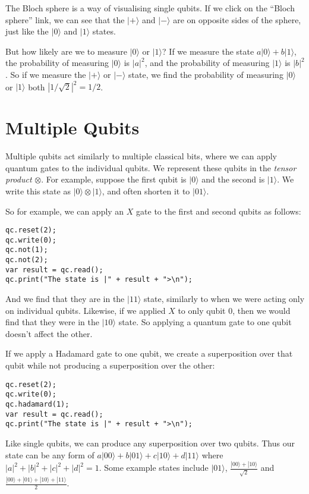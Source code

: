 \documentclass[twocolumn]{article}
\begin{document}
The Bloch sphere is a way of visualising single qubits. If we click on the ``Bloch sphere'' link, we can see that the $|+\rangle$ and $|-\rangle$ are on opposite sides of the sphere, just like the $|0\rangle$ and $|1\rangle$ states.

But how likely are we to measure $|0\rangle$ or $|1\rangle$? If we measure the state $a|0\rangle + b|1\rangle$, the probability of measuring $|0\rangle$ is $|a|^2$, and the probability of measuring $|1\rangle$ is $|b|^2$. So if we measure the $|+\rangle$ or $|-\rangle$ state, we find the probability of measuring $|0\rangle$ or $|1\rangle$ both $|1/\sqrt{2}|^2 = 1/2$.

\section{Multiple Qubits}

Multiple qubits act similarly to multiple classical bits, where we can apply quantum gates to the individual qubits. We represent these qubits in the {\em tensor product} $\otimes$. For example, suppose the first qubit is $|0\rangle$ and the second is $|1\rangle$. We write this state as $|0\rangle \otimes |1\rangle$, and often shorten it to $|01\rangle$.

So for example, we can apply an $X$ gate to the first and second qubits as follows:

\begin{lstlisting}
qc.reset(2);
qc.write(0);
qc.not(1);
qc.not(2);
var result = qc.read();
qc.print("The state is |" + result + ">\n");
\end{lstlisting}

And we find that they are in the $|11\rangle$ state, similarly to when we were acting only on individual qubits. Likewise, if we applied $X$ to only qubit $0$, then we would find that they were in the $|10\rangle$ state. So applying a quantum gate to one qubit doesn't affect the other.

If we apply a Hadamard gate to one qubit, we create a superposition over that qubit while not producing a superposition over the other:

\begin{lstlisting}
qc.reset(2);
qc.write(0);
qc.hadamard(1);
var result = qc.read();
qc.print("The state is |" + result + ">\n");
\end{lstlisting}

Like single qubits, we can produce any superposition over two qubits. Thus our state can be any form of $a|00\rangle + b|01\rangle + c|10\rangle + d|11\rangle$ where $|a|^2 + |b|^2 + |c|^2 + |d|^2 = 1$. Some example states include $|01\rangle$, $\frac{|00\rangle + |10\rangle}{\sqrt{2}}$ and $\frac{|00\rangle + |01\rangle + |10\rangle + |11\rangle}{2}$.
\end{document}
